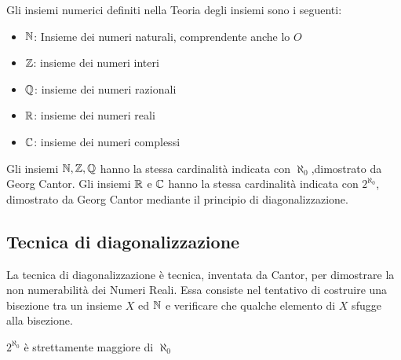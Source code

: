
Gli insiemi numerici definiti nella Teoria degli insiemi sono i seguenti:
\begin{itemize}
  \item $\mathbb{N}$: Insieme dei numeri naturali, comprendente anche lo $O$
  \item $\mathbb{Z}$: insieme dei numeri interi
  \item $\mathbb{Q}$: insieme dei numeri razionali
  \item $\mathbb{R}$: insieme dei numeri reali
  \item $\mathbb{C}$: insieme dei numeri complessi
\end{itemize}
Gli insiemi $\mathbb{N}, \mathbb{Z}, \mathbb{Q}$ hanno la stessa cardinalità indicata con $\aleph_0$,dimostrato da Georg Cantor.\newline
Gli insiemi $\mathbb{R}$ e $\mathbb{C}$ hanno la stessa cardinalità indicata con $ 2 ^ {\aleph_0}$,
dimostrato da Georg Cantor mediante il principio di diagonalizzazione.

\subsection{Tecnica di diagonalizzazione}
La tecnica di diagonalizzazione è tecnica, inventata da Cantor, per dimostrare la
non numerabilità dei Numeri Reali.\newline
Essa consiste nel tentativo di costruire una bisezione tra un insieme $X$ ed $\mathbb{N}$
e verificare che qualche elemento di $X$ sfugge alla bisezione.

\begin{thm}
    $2^{\aleph_0}$ è strettamente maggiore di $\aleph_0$
\end{thm}

